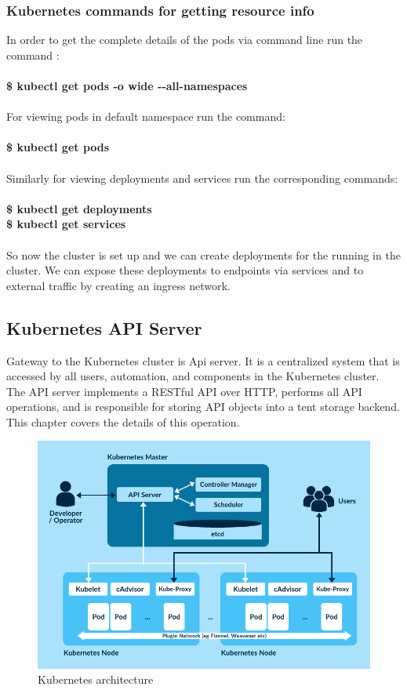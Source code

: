 \documentclass[12pt]{article}
\begin{document}
	\subsubsection{Kubernetes commands for getting resource info}
	In order to get the complete details of  the pods via command line run the command :\\\\
	\textbf{\$ kubectl get pods -o wide -{}-all-namespaces}\\\\
	For viewing pods in default namespace run the command:\\\\
	\textbf{\$ kubectl get pods}\\\\
	Similarly for viewing deployments and services run the corresponding commands:\\\\
	\textbf{\$ kubectl get deployments}\\
	\textbf{\$ kubectl get services}\\\\
	So now the cluster is set up and we can create deployments for the running in the cluster. We can expose these deployments to endpoints via services and to external traffic by creating an ingress network.
	\subsection{Kubernetes API Server}
	Gateway to the Kubernetes cluster is Api server. It is a centralized system that is accessed by all users, automation, and components in the Kubernetes cluster. The API server implements a RESTful API over HTTP, performs all API operations, and is responsible for storing API objects into a tent storage backend. This chapter covers the details of this operation.
	\begin{figure}[h!]
		\begin{center}
			\includegraphics[totalheight=0.32\textheight]{kubernetesapiserver}
			\caption{Kubernetes architecture}
		\end{center}
	\end{figure}
\end{document}
